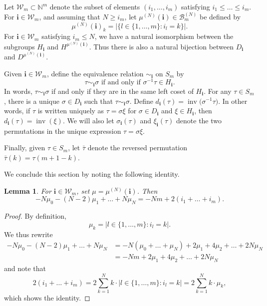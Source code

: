 \documentclass[11pt]{article}
\numberwithin{equation}{section}
\numberwithin{equation}{section}
\newtheorem{Lemma}[Theorem]{Lemma}
\DeclareMathOperator{\inv}{inv}
\newcommand{\ii}{{\mathbf{i}}}
\begin{document}
Let $\mathcal{W}_m \subset \mathbb{N}^m$ denote the subset of elements $(i_1,\dots,i_m)$ satisfying $i_1 \leq \dots \leq i_m$. For $\ii \in \mathcal{W}_m$, and assuming that $N\geq i_m$, let $\mu^{(N)}(\ii) \in \mathcal{B}_m^{(N)}$ be defined by
\[
\mu^{(N)}(\ii)_k = \vert \{ l \in \{1,\dots,m\}\colon i_l=k \} \vert.
\]
For $\ii \in \mathcal{W}_m$ satisfying $i_m \leq N$, we have a natural isomorphism between the subgroups $H_{\ii}$ and $H^{\mu^{(N)}(\ii)}$. Thus there is also a natural bijection between $D_{\ii}$ and $D^{\mu^{(N)}(\ii)}$.

Given $\ii \in \mathcal{W}_m$, define the equivalence relation $\sim_{\ii}$ on $S_m$ by
\[
\tau \sim_{\ii} \sigma \text{ if and only if } \sigma^{-1}\tau \in H_{\ii}.
\]
In words, $\tau \sim_{\ii} \sigma$ if and only if they are in the same left coset of $H_{\ii}$. For any $\tau \in S_m$, there is a unique $\sigma \in D_{\ii}$ such that $\tau \sim_{\ii} \sigma$. Define $d_{\ii}(\tau)= \inv\big(\sigma^{-1}\tau\big)$. In other words, if $\tau$ is written uniquely as $\tau=\sigma \xi$ for $\sigma \in D_{\ii}$ and $\xi \in H_{\ii}$, then $d_{\ii}(\tau) = \inv(\xi)$. We will also let $\sigma_{\ii}(\tau)$ and $\xi_{\ii}(\tau)$ denote the two permutations in the unique expression $\tau = \sigma \xi$.

Finally, given $\tau \in S_m$, let $\bar{\tau}$ denote the reversed permutation $\bar{\tau}(k)= \tau(m+1-k)$.

We conclude this section by noting the following identity.
\begin{Lemma}\label{Leem}
For $\ii \in \mathcal{W}_m$, set $\mu = \mu^{(N)}(\ii)$. Then
\[
-N\mu_{0} -(N-2)\mu_{1} + \dots + N\mu_{N} = -Nm + 2(i_1+ \dots + i_m).
\]
\end{Lemma}
\begin{proof}
By definition,
\[
\mu_k = | l \in \{1,\dots,m\}\colon i_l=k |.
\]
We thus rewrite
\begin{align*}
-N\mu_{0} -(N-2)\mu_{1} + \dots + N\mu_{N} &= -N(\mu_0 + \dots + \mu_N) + 2\mu_1 + 4\mu_2 + \dots + 2N\mu_N \\
&= -Nm+ 2\mu_1 + 4\mu_2 + \dots + 2N\mu_N
\end{align*}
and note that
\[
2(i_1 + \dots + i_m) = 2\sum_{k=1}^N k\cdot | l \in \{1,\dots,m\}\colon i_l=k | = 2\sum_{k=1}^N k\cdot \mu_k,
\]
which shows the identity.
\end{proof}
\end{document}

